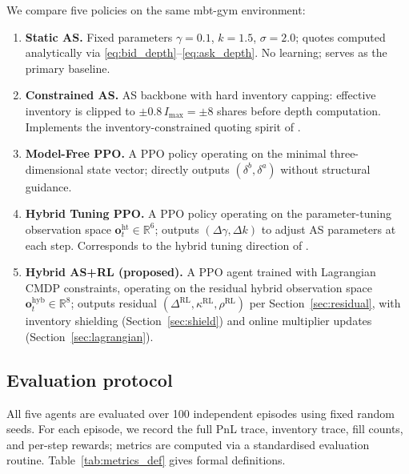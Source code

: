 \documentclass[11pt]{article}
\begin{document}
We compare five policies on the same mbt-gym environment:

\begin{enumerate}[leftmargin=*, label=\textbf{(\arabic*)}, itemsep=3pt]
  \item \textbf{Static AS.}
    Fixed parameters $\gamma = 0.1$, $k = 1.5$, $\sigma = 2.0$; quotes
    computed analytically via \eqref{eq:bid_depth}--\eqref{eq:ask_depth}.
    No learning; serves as the primary baseline.

  \item \textbf{Constrained AS.}
    AS backbone with hard inventory capping: effective inventory is clipped
    to $\pm 0.8\, I_{\max} = \pm 8$ shares before depth computation.
    Implements the inventory-constrained quoting spirit of
    \textcite{gueant2013inventory}.

  \item \textbf{Model-Free PPO.}
    A PPO policy operating on the minimal three-dimensional state vector;
    directly outputs $(\delta^b, \delta^a)$ without structural guidance.

  \item \textbf{Hybrid Tuning PPO.}
    A PPO policy operating on the parameter-tuning observation space
    $\mathbf{o}^{\text{ht}}_t \in \mathbb{R}^6$; outputs $(\Delta\gamma, \Delta k)$
    to adjust AS parameters at each step.
    Corresponds to the hybrid tuning direction of \textcite{falces2022asrl}.

  \item \textbf{Hybrid AS+RL (proposed).}
    A PPO agent trained with Lagrangian CMDP constraints, operating on the
    residual hybrid observation space $\mathbf{o}^{\text{hyb}}_t \in \mathbb{R}^8$;
    outputs residual $(\Delta^{\text{RL}}, \kappa^{\text{RL}}, \rho^{\text{RL}})$
    per Section~\ref{sec:residual}, with inventory shielding
    (Section~\ref{sec:shield}) and online multiplier updates
    (Section~\ref{sec:lagrangian}).
\end{enumerate}

\subsection{Evaluation protocol}

All five agents are evaluated over 100 independent episodes using
fixed random seeds.
For each episode, we record the full PnL trace, inventory trace, fill
counts, and per-step rewards; metrics are computed via a standardised
evaluation routine.
Table~\ref{tab:metrics_def} gives formal definitions.
\end{document}
